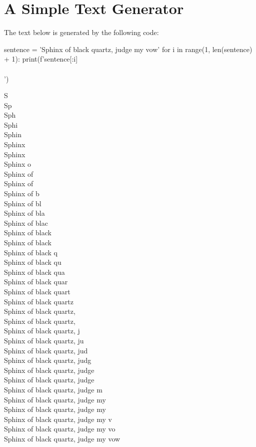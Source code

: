 \documentclass[a4paper]{book}
\begin{document}
\section{A Simple Text Generator}
\label{sec:a-simple-text-generator}
The text below is generated by the following code:
\begin{python}
sentence = 'Sphinx of black quartz, judge my vow'
for i in range(1, len(sentence) + 1):
    print(f'{sentence[:i]}\\\\')

\end{python}
S\\
Sp\\
Sph\\
Sphi\\
Sphin\\
Sphinx\\
Sphinx \\
Sphinx o\\
Sphinx of\\
Sphinx of \\
Sphinx of b\\
Sphinx of bl\\
Sphinx of bla\\
Sphinx of blac\\
Sphinx of black\\
Sphinx of black \\
Sphinx of black q\\
Sphinx of black qu\\
Sphinx of black qua\\
Sphinx of black quar\\
Sphinx of black quart\\
Sphinx of black quartz\\
Sphinx of black quartz,\\
Sphinx of black quartz, \\
Sphinx of black quartz, j\\
Sphinx of black quartz, ju\\
Sphinx of black quartz, jud\\
Sphinx of black quartz, judg\\
Sphinx of black quartz, judge\\
Sphinx of black quartz, judge \\
Sphinx of black quartz, judge m\\
Sphinx of black quartz, judge my\\
Sphinx of black quartz, judge my \\
Sphinx of black quartz, judge my v\\
Sphinx of black quartz, judge my vo\\
Sphinx of black quartz, judge my vow\\
\end{document}
